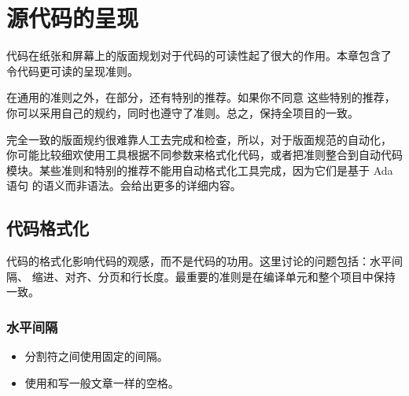 %
%
%

\chapter{源代码的呈现}
\label{c:src}
代码在纸张和屏幕上的版面规划对于代码的可读性起了很大的作用。本章包含了
令代码更可读的呈现准则。

在通用的准则之外，在部分，还有特别的推荐。如果你不同意
这些特别的推荐，你可以采用自己的规约，同时也遵守了准则。总之，保持全项目的一致。

完全一致的版面规约很难靠人工去完成和检查，所以，对于版面规范的自动化，
你可能比较细欢使用工具根据不同参数来格式化代码，或者把准则整合到自动代码
模块。某些准则和特别的推荐不能用自动格式化工具完成，因为它们是基于 Ada 语句
的语义而非语法。会给出更多的详细内容。

\section{代码格式化}
代码的格式化影响代码的观感，而不是代码的功用。这里讨论的问题包括：水平间隔、
缩进、对齐、分页和行长度。最重要的准则是在编译单元和整个项目中保持一致。

\subsection{水平间隔}
\begin{itemize}
    \item 分割符之间使用固定的间隔。
    \item 使用和写一般文章一样的空格。
\end{itemize} 


